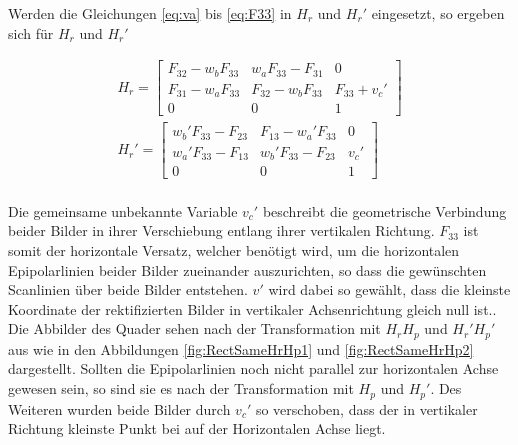 Werden die Gleichungen \ref{eq:va} bis \ref{eq:F33} in $H_r$ und $H_r'$ eingesetzt, so ergeben sich für $H_r$ und $H_r'$ 


\begin{gather}
	H_r = \begin{bmatrix}
		F_{32}-w_bF_{33}&w_aF_{33}-F_{31}&0\\
		F_{31}-w_aF_{33}&F_{32}-w_bF_{33}&F_{33}+v_c'\\
		0&0&1
	\end{bmatrix}\\
	H_r'=
	\begin{bmatrix}
		w_b'F_{33}-F_{23}&F_{13}-w_a'F_{33}&0\\
		w_a'F_{33}-F_{13}&w_b'F_{33}-F_{23}&v_c'\\
		0&0&1
	\end{bmatrix}
\end{gather}\\


Die gemeinsame unbekannte Variable $v_c'$ beschreibt die geometrische Verbindung beider Bilder in ihrer Verschiebung entlang ihrer vertikalen Richtung\cite{ZZ}. $F_33$ ist somit der horizontale Versatz, welcher benötigt wird, um die horizontalen Epipolarlinien beider Bilder zueinander auszurichten, so dass die gewünschten Scanlinien über beide Bilder entstehen. $v'$ wird dabei so gewählt, dass die kleinste Koordinate der rektifizierten Bilder in vertikaler Achsenrichtung gleich null ist.\cite{ZZ}.\\


%

Die Abbilder des Quader sehen nach der Transformation mit $H_rH_p$ und $H_r'H_p'$ aus wie in den Abbildungen \ref{fig:RectSameHrHp1} und \ref{fig:RectSameHrHp2} dargestellt. Sollten die Epipolarlinien noch nicht parallel zur horizontalen Achse gewesen sein, so sind sie es nach der Transformation mit $H_p$ und $H_p'$. Des Weiteren wurden beide Bilder durch $v_c'$ so verschoben, dass der in vertikaler Richtung kleinste Punkt bei auf der Horizontalen Achse liegt. 

